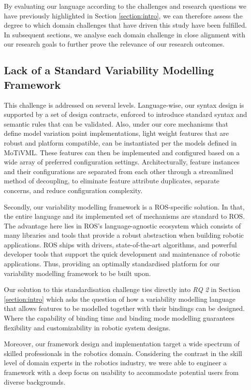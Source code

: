 \documentclass[conference]{IEEEtran}
\begin{document}
By evaluating our language according to the challenges and research questions we have previously highlighted in Section \ref{section:intro}, we can therefore assess the degree to which domain challenges that have driven this study have been fulfilled. In subsequent sections, we analyse each domain challenge in close alignment with our research goals to further prove the relevance of our research outcomes.

\subsection{Lack of a Standard Variability Modelling Framework}
This challenge is addressed on several levels. Language-wise, our syntax design is supported by a set of design contracts, enforced to introduce standard syntax and semantic rules that can be validated. Also, under our core mechanisms that define model variation point implementations, light weight features that are robust and platform compatible, can be instantiated per the models defined in MoTiVML. These features can then be implemented and configured based on a wide array of preferred configuration settings. Architecturally, feature instances and their configurations are separated from each other through a streamlined method of decoupling, to eliminate feature attribute duplicates, separate concerns, and reduce configuration complexity.

Secondly, our variability modelling framework is a ROS-specific solution. In that, the entire language and its implemented set of mechanisms are standard to ROS. The advantage here lies in ROS's language-agnostic ecosystem which consists of many libraries and tools that provide a robust abstraction when building robotic applications. ROS ships with drivers, state-of-the-art algorithms, and powerful developer tools that support the quick development and maintenance of robotic applications. Thus, providing an optimally standardised platform for our variability modelling framework to be built upon.

Our solution to this standardisation challenge ties directly into \textit{RQ 2} in Section \ref{section:intro} which asks the question of how a variability modelling language that allows features to be modelled together with their bindings can be designed. Where the capability of binding time and binding mode modelling guarantees flexibility and customizability in robotic system designs.

Moreover, our framework design and implementation target a wide spectrum of skilled professionals in the robotics domain. Considering the contrast in the skill level of domain experts in the robotics industry, we were able to engineer a framework with a deep focus on usability to accommodate potential users from diverse backgrounds.
\end{document}
